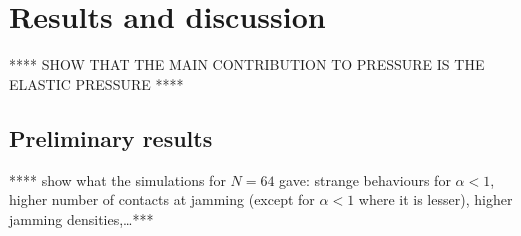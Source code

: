 \documentclass[class=report, float=false, crop=false]{standalone}
\begin{document}
\chapter{Results and discussion}
\label{chap:results}

**** SHOW THAT THE MAIN CONTRIBUTION TO PRESSURE IS THE ELASTIC PRESSURE ****

\section{Preliminary results}

**** show what the simulations for $N=64$ gave: strange behaviours for $\alpha<1$, higher number of contacts at jamming (except for $\alpha<1$ where it is lesser), higher jamming densities,\ldots ****

% 
\end{document}
